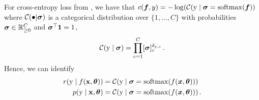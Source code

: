 \begin{example}
  For cross-entropy loss from , we have that $c({\bm{f}}, y) = - \log( {\mathcal{C}}({\textnormal{y}} \mid {\bm{\sigma}} = \mathrm{softmax}({\bm{f}}) )$ where ${\mathcal{C}}(\bullet | {\bm{\sigma}})$ is a categorical distribution over $\{1, \dots, C\}$ with probabilities ${\bm{\sigma}} \in {\mathbb{R}}^C_{\ge 0}$ and ${\bm{\sigma}}^\top {\bm{1}} = 1$,
  \begin{align*}
    {\mathcal{C}}({\textnormal{y}} \mid {\bm{\sigma}})
    =
    \prod_{c=1}^C [{\bm{\sigma}}]_c^{\delta_{{\textnormal{y}},c}}\,.
  \end{align*}
  Hence, we can identify
  \begin{align*}
    r({\textnormal{y}} \mid f({\mathbf{x}}, {\bm{\theta}})) &= {\mathcal{C}}({\textnormal{y}} \mid {\bm{\sigma}} = \mathrm{softmax}(f({\bm{x}}, {\bm{\theta}})))\,
    \\
    p({\textnormal{y}} \mid {\mathbf{x}}, {\bm{\theta}}) &= {\mathcal{C}}({\textnormal{y}} \mid {\bm{\sigma}} = \mathrm{softmax}(f({\bm{x}}, {\bm{\theta}})))\,.
  \end{align*}
\end{example}
